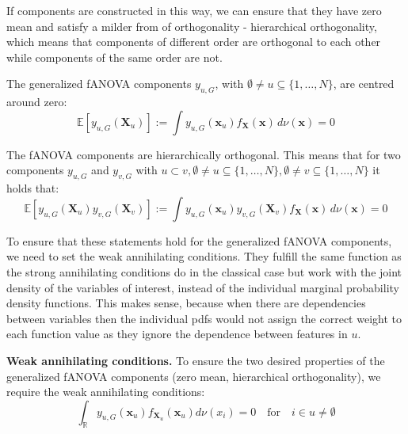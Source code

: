 If components are constructed in this way, we can ensure that they have zero mean and satisfy a milder from of orthogonality - hierarchical orthogonality, which means that components of different order are orthogonal to each other while components of the same order are not.
\begin{proposition}
    The generalized fANOVA components $y_{u, G}$, with $\emptyset \neq u \subseteq \{1, \ldots, N\}$, are centred around zero:
\begin{equation}
    \mathbb{E}[y_{u, G}(\boldsymbol{X}_u)] := \int y_{u, G}(\boldsymbol{x}_u) f_{\boldsymbol{X}}(\boldsymbol{x}) \, d\nu (\boldsymbol{x}) = 0
    \label{eq:zero_mean_g}
\end{equation}
\end{proposition}

\begin{proposition}
    The fANOVA components are hierarchically orthogonal. This means that for two components $y_{u, G}$ and $y_{v, G}$ with $u \subset v, \emptyset \neq u \subseteq \{1, \ldots, N\}, \emptyset \neq v \subseteq \{1, \ldots, N\} $ it holds that:
\begin{equation}
    \mathbb{E}[y_{u, G}(\boldsymbol{X}_u)y_{v, G}(\boldsymbol{X}_v)] := \int y_{u, G}(\boldsymbol{x}_u) y_{v, G}(\boldsymbol{X}_v) f_{\boldsymbol{X}}(\boldsymbol{x}) \, d\nu (\boldsymbol{x}) = 0
\end{equation}
\label{eq:orthogonality_g}
\end{proposition}

To ensure that these statements hold for the generalized fANOVA components, we need to set the weak annihilating conditions.
They fulfill the same function as the strong annihilating conditions do in the classical case but work with the joint density of the variables of interest, instead of the individual marginal probability density functions.
{\color{red}This makes sense, because when there are dependencies between variables then the individual pdfs would not assign the correct weight to each function value as they ignore the dependence between features in $u$.}
\begin{proposition}
    \textbf{Weak annihilating conditions.}
    To ensure the two desired properties of the generalized fANOVA components (zero mean, hierarchical orthogonality), we require the weak annihilating conditions:
\begin{equation}
    \int_{\mathbb{R}} y_{u, G}(\boldsymbol{x}_u) f_{\boldsymbol{X}_u}(\boldsymbol{x}_u) d\nu (x_i) = 0 \quad \text{for} \quad i \in u \neq \emptyset
\end{equation}
\end{proposition}

